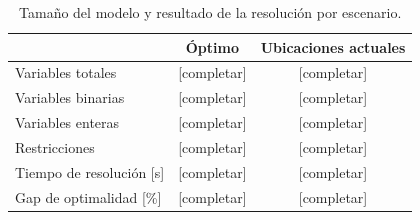 \begin{table}[h]
    \centering
    \caption{Tamaño del modelo y resultado de la resolución por escenario.}
    \label{tab:tamano}
    \begin{tabular}{lcc}
        \hline
        & Óptimo & Ubicaciones actuales \\
        \hline
        Variables totales            & [completar] & [completar] \\
        Variables binarias           & [completar] & [completar] \\
        Variables enteras            & [completar] & [completar] \\
        Restricciones                & [completar] & [completar] \\
        Tiempo de resolución [s]     & [completar] & [completar] \\
        Gap de optimalidad [\%]      & [completar] & [completar] \\
        \hline
    \end{tabular}
\end{table}
